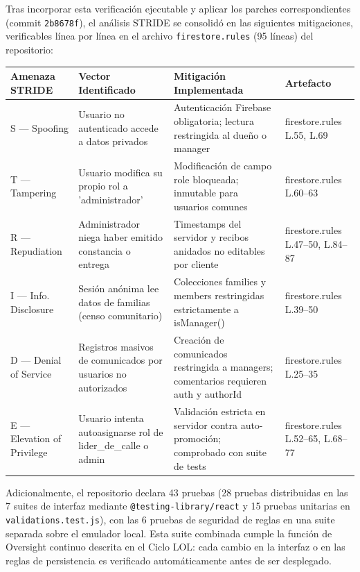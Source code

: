 \documentclass[14pt,a4paper,oneside]{extbook}
\begin{document}
Tras incorporar esta verificación ejecutable y aplicar los parches correspondientes (commit \texttt{2b8678f}), el análisis STRIDE se consolidó en las siguientes mitigaciones, verificables línea por línea en el archivo \texttt{firestore.rules} (95 líneas) del repositorio:

\begin{table}[htbp]
\centering
\begin{tabular}{p{} p{} p{} p{}}
\toprule
\textbf{Amenaza STRIDE} & \textbf{Vector Identificado} & \textbf{Mitigación Implementada} & \textbf{Artefacto} \\
\midrule
S — Spoofing & Usuario no autenticado accede a datos privados & Autenticación Firebase obligatoria; lectura restringida al dueño o manager & firestore.rules L.55, L.69 \\
T — Tampering & Usuario modifica su propio rol a 'administrador' & Modificación de campo role bloqueada; inmutable para usuarios comunes & firestore.rules L.60–63 \\
R — Repudiation & Administrador niega haber emitido constancia o entrega & Timestamps del servidor y recibos anidados no editables por cliente & firestore.rules L.47–50, L.84–87 \\
I — Info. Disclosure & Sesión anónima lee datos de familias (censo comunitario) & Colecciones families y members restringidas estrictamente a isManager() & firestore.rules L.39–50 \\
D — Denial of Service & Registros masivos de comunicados por usuarios no autorizados & Creación de comunicados restringida a managers; comentarios requieren auth y authorId & firestore.rules L.25–35 \\
E — Elevation of Privilege & Usuario intenta autoasignarse rol de lider\_de\_calle o admin & Validación estricta en servidor contra auto-promoción; comprobado con suite de tests & firestore.rules L.52–65, L.68–77 \\
\bottomrule
\end{tabular}
\end{table}

Adicionalmente, el repositorio declara 43 pruebas (28 pruebas distribuidas en las 7 suites de interfaz mediante \texttt{@testing-library/react} y 15 pruebas unitarias en \texttt{validations.test.js}), con las 6 pruebas de seguridad de reglas en una suite separada sobre el emulador local. Esta suite combinada cumple la función de Oversight continuo descrita en el Ciclo LOL: cada cambio en la interfaz o en las reglas de persistencia es verificado automáticamente antes de ser desplegado.
\end{document}
